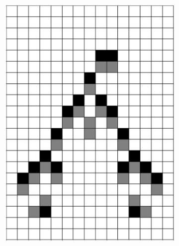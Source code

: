 \documentclass[12pt]{article}
\numberwithin{figure}{section} %
\begin{document}
\begin{figure}[H]
\begin{subfigure}{0.19\textwidth}
     \includegraphics[width=\linewidth]{Section4/26.1}
     \subcaption{}
   \end{subfigure}
        \begin{subfigure}{0.19\textwidth}
     \centering

\end{subfigure}
\end{figure}
\end{document}
